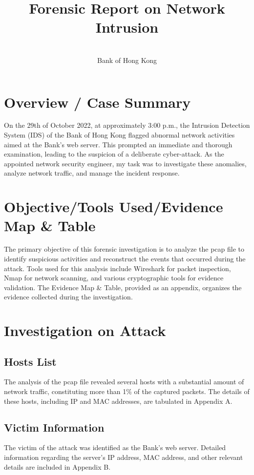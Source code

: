 \documentclass{article}
\title{\fontsize{16pt}{19pt}\selectfont\textbf{Forensic Report on Network Intrusion}}
\author{\fontsize{12pt}{14pt}\selectfont [Your Name] \\ Bank of Hong Kong}
\date{\fontsize{12pt}{14pt}\selectfont [Date of the Report]}
\begin{document}
    \maketitle

    \section*{\fontsize{14pt}{17pt}\selectfont Overview / Case Summary}
    On the 29th of October 2022, at approximately 3:00 p.m.,
    the Intrusion Detection System (IDS) of the Bank of Hong Kong flagged abnormal network activities aimed at the Bank's web server.
    This prompted an immediate and thorough examination,
    leading to the suspicion of a deliberate cyber-attack.
    As the appointed network security engineer, my task was to investigate these anomalies,
    analyze network traffic, and manage the incident response.

    \section*{\fontsize{14pt}{17pt}\selectfont Objective/Tools Used/Evidence Map \& Table}
    The primary objective of this forensic investigation is to analyze the pcap file to identify suspicious activities
    and reconstruct the events that occurred during the attack.
    Tools used for this analysis include Wireshark for packet inspection,
    Nmap for network scanning, and various cryptographic tools for evidence validation.
    The Evidence Map & Table, provided as an appendix, organizes the evidence collected during the investigation.

    \section*{\fontsize{14pt}{17pt}\selectfont Investigation on Attack}
    \subsection*{Hosts List}
    The analysis of the pcap file revealed several hosts with a substantial amount of network traffic,
    constituting more than 1\% of the captured packets.
    The details of these hosts, including IP and MAC addresses, are tabulated in Appendix A.

    \subsection*{Victim Information}
    The victim of the attack was identified as the Bank's web server.
    Detailed information regarding the server's IP address, MAC address, and other relevant details are included in Appendix B.
\end{document}
